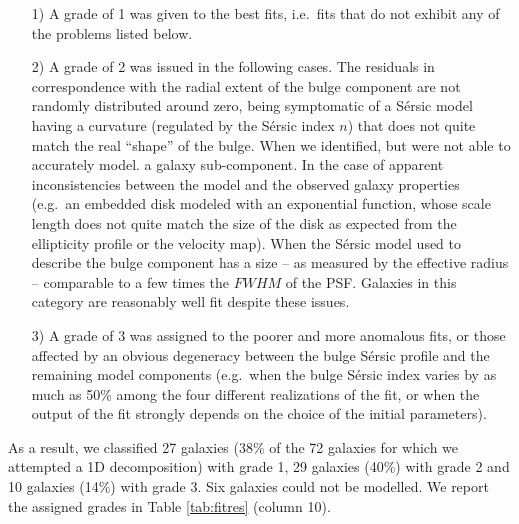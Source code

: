 \documentclass[preprint2]{emulateapj}
\begin{document}
\begin{itemize}
\item [1)] A grade of 1 was given to the best fits, i.e.~fits that do not exhibit any of the problems listed below.
\item [2)] A grade of 2 was issued in the following cases. 
The residuals in correspondence with the radial extent of the bulge component are not randomly distributed around zero, 
being symptomatic of a S\'ersic model having a curvature (regulated by the S\'ersic index $n$) 
that does not quite match the real ``shape'' of the bulge. 
When we identified, but were not able to accurately model. a galaxy sub-component.
In the case of apparent inconsistencies between the model and the observed galaxy properties 
(e.g.~an embedded disk modeled with an exponential function, 
whose scale length does not quite match the size of the disk as expected from the ellipticity profile or the velocity map).
When the S\'ersic model used to describe the bulge component has a size -- as measured by the effective radius -- 
comparable to a few times the $FWHM$ of the PSF.
Galaxies in this category are reasonably well fit despite these issues.
\item [3)] A grade of 3 was assigned to the poorer and more anomalous fits, 
or those affected by an obvious degeneracy between the bulge S\'ersic profile and the remaining model components 
(e.g.~when the bulge S\'ersic index varies by as much as 50\% among the four different realizations of the fit, 
or when the output of the fit strongly depends on the choice of the initial parameters).
\end{itemize}
As a result, we classified 27 galaxies (38\% of the 72 galaxies for which we attempted a 1D decomposition) with grade 1, 
29 galaxies (40\%) with grade 2 and 10 galaxies (14\%) with grade 3.
Six galaxies could not be modelled.
We report the assigned grades in Table \ref{tab:fitres} (column 10).
\end{document}
